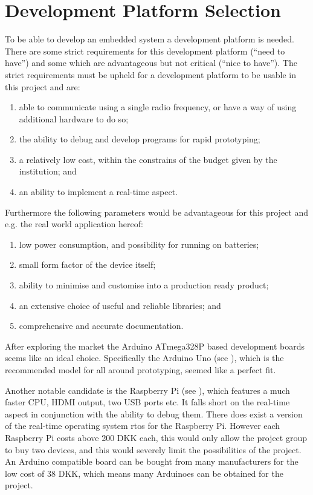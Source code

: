 
\section{Development Platform Selection}
To be able to develop an embedded system a development platform is needed. 
There are some strict requirements for this development platform (``need to have'') and some which are advantageous but not critical (``nice to have'').
The strict requirements must be upheld for a development platform to be usable in this project and are:

\begin{enumerate}[label=\itshape \alph*\upshape)]
\item able to communicate using a single radio frequency, or have a way of using additional hardware to do so;
\item the ability to debug and develop programs for rapid prototyping;
\item a relatively low cost, within the constrains of the budget given by the institution;
and
\item an ability to implement a real-time aspect.
\end{enumerate}

Furthermore the following parameters would be advantageous for this project and e.g. the real world application hereof:

\begin{enumerate}[label=\itshape \alph*\upshape), resume]
\item low power consumption, and possibility for running on batteries;
\item small form factor of the device itself;
\item ability to minimise and customise into a production ready product;
\item an extensive choice of useful and reliable libraries;
and
\item comprehensive and accurate documentation.
\end{enumerate}

\bigskip
After exploring the market the Arduino ATmega328P based development boards seems like an ideal choice.
Specifically the Arduino Uno (see \cite{ArduinoUNO}), which is the recommended model for all around prototyping, seemed like a perfect fit.

Another notable candidate is the Raspberry Pi (see \cite{RaspberryPI}), which features a much faster CPU, HDMI output, two USB ports etc.
It falls short on the real-time aspect in conjunction with the ability to debug them. 
There does exist a version of the real-time operating system \gls{rtos} for the Raspberry Pi.
However each Raspberry Pi costs above 200 DKK each, this would only allow the project group to buy two devices, and this would severely limit the possibilities of the project.
An Arduino compatible board can be bought from many manufacturers for the low cost of 38 DKK, which means many Arduinoes can be obtained for the project.

